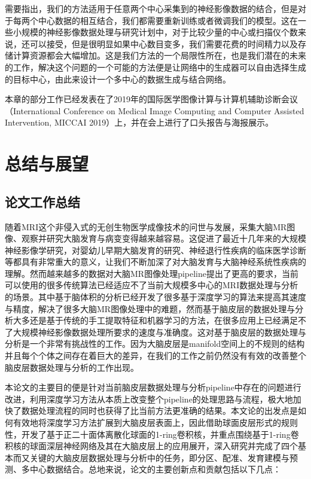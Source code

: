 需要指出，我们的方法适用于任意两个中心采集到的神经影像数据的结合，但是对于每两个中心数据的相互结合，我们都需要重新训练或者微调我们的模型。这在一些小规模的神经影像数据处理与研究计划中，对于比较少量的中心或扫描仪个数来说，还可以接受，但是很明显如果中心数目变多，我们需要花费的时间精力以及存储计算资源都会大幅增加。这是我们方法的一个局限性所在，也是我们潜在的未来的工作，解决这个问题的一个可能的方法便是让网络中的生成器可以自由选择生成的目标中心，由此来设计一个多中心的数据生成与结合网络。

本章的部分工作已经发表在了2019年的国际医学图像计算与计算机辅助诊断会议（International Conference on Medical Image Computing and Computer Assisted Intervention, MICCAI 2019）上，并在会上进行了口头报告与海报展示。










\chapter{总结与展望}

\section{论文工作总结}
随着MRI这个非侵入式的无创生物医学成像技术的问世与发展，采集大脑MR图像、观察并研究大脑发育与病变变得越来越容易。这促进了最近十几年来的大规模神经影像学研究，对婴幼儿早期大脑发育的研究、神经退行性疾病的临床医学诊断等都具有非常重大的意义，让我们不断加深了对大脑发育与大脑神经系统性疾病的理解。然而越来越多的数据对大脑MR图像处理pipeline提出了更高的要求，当前可以使用的很多传统算法已经适应不了当前大规模多中心的MRI数据处理与分析的场景。其中基于脑体积的分析已经开发了很多基于深度学习的算法来提高其速度与精度，解决了很多大脑MR图像处理中的难题，然而基于脑皮层的数据处理与分析大多还是基于传统的手工提取特征和机器学习的方法，在很多应用上已经满足不了大规模神经影像数据处理所要求的速度与准确度。这对基于脑皮层的数据处理与分析是一个非常有挑战性的工作。因为大脑皮层是manifold空间上的不规则的结构并且每个个体之间存在着巨大的差异，在我们的工作之前仍然没有有效的改善整个脑皮层数据处理与分析的工作出现。

本论文的主要目的便是针对当前脑皮层数据处理与分析pipeline中存在的问题进行改进，利用深度学习方法从本质上改变整个pipeline的处理思路与流程，极大地加快了数据处理流程的同时也获得了比当前方法更准确的结果。本文论的出发点是如何有效地将深度学习方法扩展到大脑皮层表面上，因此借助球面皮层形式的规则性，开发了基于正二十面体离散化球面的1-ring卷积核，并重点围绕基于1-ring卷积核的球面深层神经网络及其在大脑皮层上的应用展开，深入研究并完成了四个基本而又关键的大脑皮层数据处理与分析中的任务，即分区、配准、发育建模与预测、多中心数据结合。总地来说，论文的主要创新点和贡献包括以下几点：

